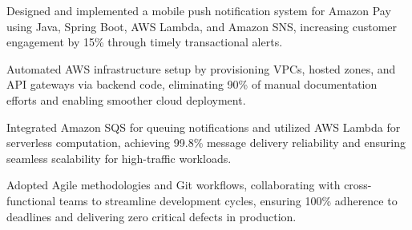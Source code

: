 \documentclass[]{resumebb}
\begin{document}
\begin{tightemize}
    \item Designed and implemented a mobile push notification system for Amazon Pay using Java, Spring Boot, AWS Lambda, and Amazon SNS, increasing customer engagement by 15\% through timely transactional alerts.
    \item Automated AWS infrastructure setup by provisioning VPCs, hosted zones, and API gateways via backend code, eliminating 90\% of manual documentation efforts and enabling smoother cloud deployment.
    \item Integrated Amazon SQS for queuing notifications and utilized AWS Lambda for serverless computation, achieving 99.8\% message delivery reliability and ensuring seamless scalability for high-traffic workloads.
    \item Adopted Agile methodologies and Git workflows, collaborating with cross-functional teams to streamline development cycles, ensuring 100\% adherence to deadlines and delivering zero critical defects in production.
\end{tightemize}

\vspace{-4pt}
\end{document}
